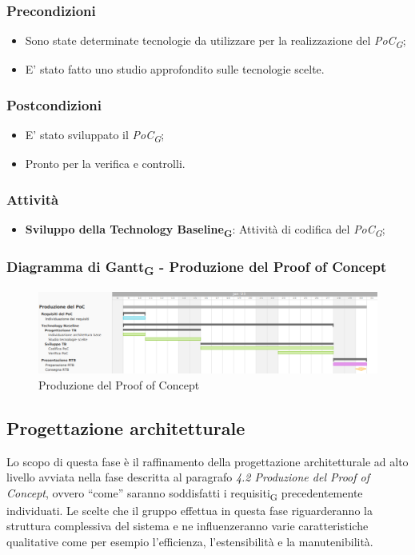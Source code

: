 \subsubsection{Precondizioni}\:
\begin{itemize}
	\item Sono state determinate tecnologie da utilizzare per la realizzazione del \textit{PoC\textsubscript{G}};
	\item E' stato fatto uno studio approfondito sulle tecnologie scelte.
\end{itemize}

\subsubsection{Postcondizioni}\:
\begin{itemize}
	\item E' stato sviluppato il \textit{PoC\textsubscript{G}};
	\item Pronto per la verifica e controlli.
\end{itemize}

\subsubsection{Attività}\:
\begin{itemize}
    \item \textbf{Sviluppo della Technology Baseline\textsubscript{G}}: Attività di codifica del \textit{PoC\textsubscript{G}};
\end{itemize}

\subsubsection{Diagramma di Gantt\textsubscript{G} - Produzione del Proof of Concept}

\begin{figure}[H]
\centering
\includegraphics[width=\textwidth]{img/4_produzione.png}
\caption{Produzione del Proof of Concept}
\end{figure}

\subsection{Progettazione architetturale}
Lo scopo di questa fase è il raffinamento della progettazione architetturale ad alto livello avviata nella fase descritta al paragrafo \textit{4.2 Produzione del Proof of Concept}, ovvero “come” saranno soddisfatti i requisiti\textsubscript{G} precedentemente individuati.
Le scelte che il gruppo effettua in questa fase riguarderanno la struttura complessiva del sistema e ne influenzeranno varie caratteristiche qualitative come per esempio l’efficienza, l’estensibilità e la manutenibilità.

